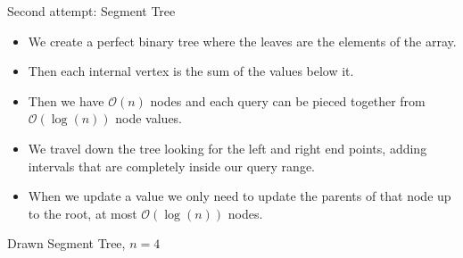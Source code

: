 \documentclass{beamer}
\begin{document}
\begin{frame}{Second attempt: Segment Tree}
    \begin{itemize}
        \item<1-> We create a perfect binary tree where the leaves are the elements of the array.
        \item<2-> Then each internal vertex is the sum of the values below it.
        \item<3-> Then we have $\mathcal{O}(n)$ nodes and each query can be pieced together from $\mathcal{O}(\log(n))$ node values.
        \item<4-> We travel down the tree looking for the left and right end points, adding intervals that are completely inside our query range.
        \item<5-> When we update a value we only need to update the parents of that node up to the root, at most $\mathcal{O}(\log(n))$ nodes.
    \end{itemize}
\end{frame}

\begin{frame}[plain]{Drawn Segment Tree, $n = 4$}
	\begin{center}
    \end{center}
\end{frame}
\end{document}
